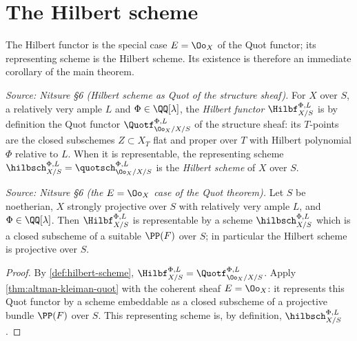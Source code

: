 \section{The Hilbert scheme}

The Hilbert functor is the special case $E = \Oo_X$ of the Quot functor; its
representing scheme is the Hilbert scheme. Its existence is therefore an
immediate corollary of the main theorem.

\begin{definition}
  \label{def:hilbert-scheme}
  \textit{Source: Nitsure §6 (Hilbert scheme as Quot of the structure sheaf).}
  For $X$ over $S$, a relatively very ample $L$ and $\Phi\in\QQ[\lambda]$, the
  \emph{Hilbert functor} $\Hilbf_{X/S}^{\Phi,L}$ is by definition the Quot
  functor $\Quotf_{\Oo_X/X/S}^{\Phi,L}$ of the structure sheaf: its $T$-points are
  the closed subschemes $Z\subset X_T$ flat and proper over $T$ with Hilbert
  polynomial $\Phi$ relative to $L$. When it is representable, the representing
  scheme $\hilbsch_{X/S}^{\Phi,L} = \quotsch_{\Oo_X/X/S}^{\Phi,L}$ is the
  \emph{Hilbert scheme} of $X$ over $S$.
\end{definition}

\begin{theorem}
  \label{thm:hilbert-scheme-exists}
  \textit{Source: Nitsure §6 (the $E=\Oo_X$ case of the Quot theorem).}
  Let $S$ be noetherian, $X$ strongly projective over $S$ with relatively very
  ample $L$, and $\Phi\in\QQ[\lambda]$. Then $\Hilbf_{X/S}^{\Phi,L}$ is
  representable by a scheme $\hilbsch_{X/S}^{\Phi,L}$ which is a closed subscheme
  of a suitable $\PP(F)$ over $S$; in particular the Hilbert scheme is projective
  over $S$.
\end{theorem}

\begin{proof}
  By \cref{def:hilbert-scheme}, $\Hilbf_{X/S}^{\Phi,L} = \Quotf_{\Oo_X/X/S}^{\Phi,L}$.
  Apply \cref{thm:altman-kleiman-quot} with the coherent sheaf $E = \Oo_X$: it
  represents this Quot functor by a scheme embeddable as a closed subscheme of a
  projective bundle $\PP(F)$ over $S$. This representing scheme is, by definition,
  $\hilbsch_{X/S}^{\Phi,L}$.
\end{proof}

